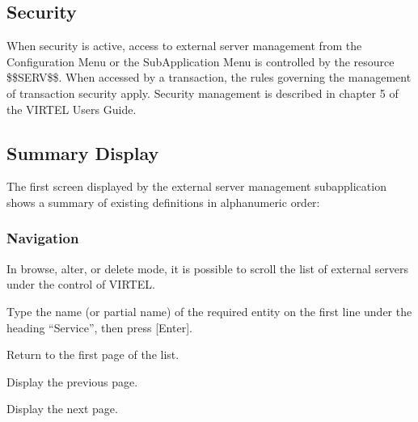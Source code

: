 \documentclass[letterpaper,10pt,english]{sphinxmanual}
\begin{document}
\subsection{Security}
\label{\detokenize{connectivity_guide:index-134}}\label{\detokenize{connectivity_guide:id69}}
\sphinxAtStartPar
When security is active, access to external server management from the Configuration Menu or the Sub\sphinxhyphen{}Application Menu is controlled by the resource \$\$SERV\$\$.
When accessed by a transaction, the rules governing the management of transaction security apply.
Security management is described in chapter 5 of the VIRTEL Users Guide.

\ignorespaces 

\subsection{Summary Display}
\label{\detokenize{connectivity_guide:index-135}}\label{\detokenize{connectivity_guide:id70}}
\sphinxAtStartPar
The first screen displayed by the external server management sub\sphinxhyphen{}application shows a summary of existing definitions in alphanumeric order:

\sphinxAtStartPar
{}


\subsubsection{Navigation}
\label{\detokenize{connectivity_guide:id71}}
\sphinxAtStartPar
In browse, alter, or delete mode, it is possible to scroll the list of external servers under the control of VIRTEL.
\begin{description}
\sphinxAtStartPar
Type the name (or partial name) of the required entity on the first line under the heading “Service”, then press {[}Enter{]}.

\sphinxlineitem{{[}PF6{]}}
\sphinxAtStartPar
Return to the first page of the list.

\sphinxlineitem{{[}PF7{]}}
\sphinxAtStartPar
Display the previous page.

\sphinxlineitem{{[}PF8{]}}
\sphinxAtStartPar
Display the next page.

\end{description}
\end{document}
